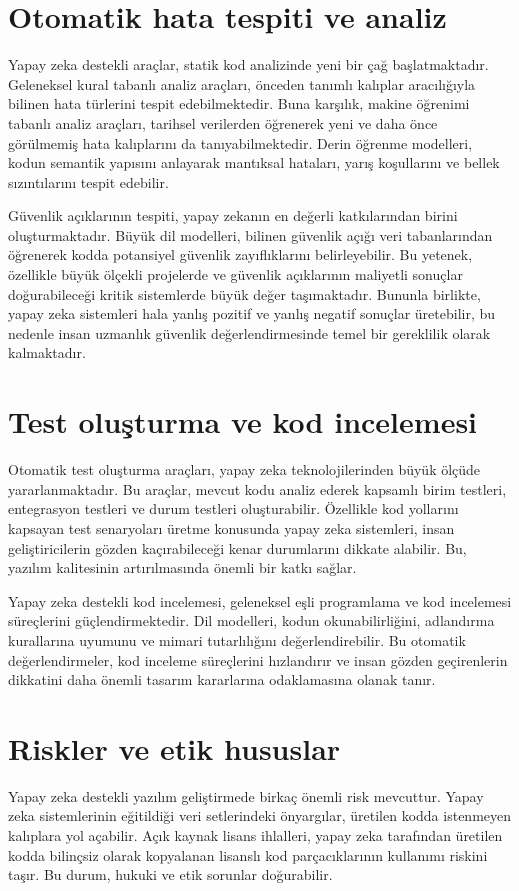 \documentclass[
    language=turkish,
    doctype=article,
]{../../omnilatex}
\begin{document}
\section{Otomatik hata tespiti ve analiz}
Yapay zeka destekli araçlar, statik kod analizinde yeni bir çağ başlatmaktadır. Geleneksel kural tabanlı analiz araçları, önceden tanımlı kalıplar aracılığıyla bilinen hata türlerini tespit edebilmektedir. Buna karşılık, makine öğrenimi tabanlı analiz araçları, tarihsel verilerden öğrenerek yeni ve daha önce görülmemiş hata kalıplarını da tanıyabilmektedir. Derin öğrenme modelleri, kodun semantik yapısını anlayarak mantıksal hataları, yarış koşullarını ve bellek sızıntılarını tespit edebilir.

Güvenlik açıklarının tespiti, yapay zekanın en değerli katkılarından birini oluşturmaktadır. Büyük dil modelleri, bilinen güvenlik açığı veri tabanlarından öğrenerek kodda potansiyel güvenlik zayıflıklarını belirleyebilir. Bu yetenek, özellikle büyük ölçekli projelerde ve güvenlik açıklarının maliyetli sonuçlar doğurabileceği kritik sistemlerde büyük değer taşımaktadır. Bununla birlikte, yapay zeka sistemleri hala yanlış pozitif ve yanlış negatif sonuçlar üretebilir, bu nedenle insan uzmanlık güvenlik değerlendirmesinde temel bir gereklilik olarak kalmaktadır.

\section{Test oluşturma ve kod incelemesi}
Otomatik test oluşturma araçları, yapay zeka teknolojilerinden büyük ölçüde yararlanmaktadır. Bu araçlar, mevcut kodu analiz ederek kapsamlı birim testleri, entegrasyon testleri ve durum testleri oluşturabilir. Özellikle kod yollarını kapsayan test senaryoları üretme konusunda yapay zeka sistemleri, insan geliştiricilerin gözden kaçırabileceği kenar durumlarını dikkate alabilir. Bu, yazılım kalitesinin artırılmasında önemli bir katkı sağlar.

Yapay zeka destekli kod incelemesi, geleneksel eşli programlama ve kod incelemesi süreçlerini güçlendirmektedir. Dil modelleri, kodun okunabilirliğini, adlandırma kurallarına uyumunu ve mimari tutarlılığını değerlendirebilir. Bu otomatik değerlendirmeler, kod inceleme süreçlerini hızlandırır ve insan gözden geçirenlerin dikkatini daha önemli tasarım kararlarına odaklamasına olanak tanır.

\section{Riskler ve etik hususlar}
Yapay zeka destekli yazılım geliştirmede birkaç önemli risk mevcuttur. Yapay zeka sistemlerinin eğitildiği veri setlerindeki önyargılar, üretilen kodda istenmeyen kalıplara yol açabilir. Açık kaynak lisans ihlalleri, yapay zeka tarafından üretilen kodda bilinçsiz olarak kopyalanan lisanslı kod parçacıklarının kullanımı riskini taşır. Bu durum, hukuki ve etik sorunlar doğurabilir.
\end{document}
